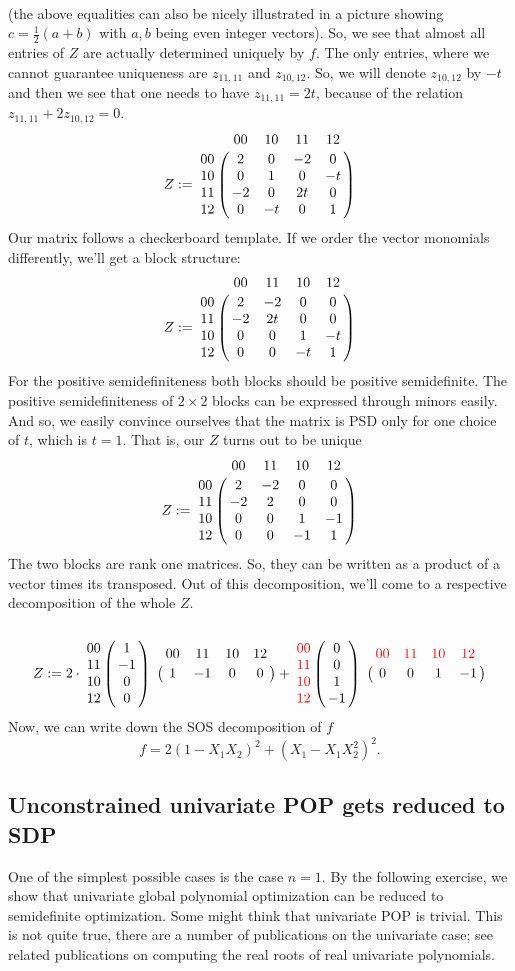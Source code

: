 \begin{solution}
\begin{align*}
		\end{align*}
		(the above equalities can also be nicely illustrated in a picture showing  $c= \frac{1}{2} (a+b)$ with $a,b$ being even integer vectors).
		So, we see that almost all entries of $Z$ are actually determined uniquely by $f$. The only entries, where we cannot guarantee uniqueness are $z_{11,11}$ and $z_{10,12}$. So, we will denote $z_{10,12}$ by $-t$ and then we see that one needs to have $z_{11,11}= 2t $, because of the relation $z_{11,11} + 2 z_{10,12} = 0$. 
		\[
		Z:=\bordermatrix{
			& 00 & 10 & 11 & 12
			\cr 00 & 2 & 0 & -2 & 0
			\cr 10 & 0 & 1 & 0 & -t
			\cr 11 & -2 & 0 & 2t & 0
			\cr 12 & 0 & -t & 0 & 1
		}
		\]
		Our matrix follows a checkerboard template. If we order the vector monomials differently, we'll get a block structure: 
		\[
		Z:=\bordermatrix{
			& 00 & 11 & 10 & 12
			\cr 00 & 2 & -2 & 0 & 0
			\cr 11 & -2 & 2t & 0 & 0
			\cr 10 & 0 & 0 & 1 & -t
			\cr 12 & 0 & 0 & -t & 1
		}
		\]		
		For the positive semidefiniteness both blocks should be positive semidefinite. The positive semidefiniteness of $2 \times 2$ blocks can be expressed through minors easily. And so, we easily convince ourselves that the matrix is PSD only for one choice of $t$, which is $t=1$. That is, our $Z$ turns out to be unique
		\[
		Z:=\bordermatrix{
			& 00 & 11 & 10 & 12
			\cr 00 & 2 & -2 & 0 & 0
			\cr 11 & -2 & 2 & 0 & 0
			\cr 10 & 0 & 0 & 1 & -1
			\cr 12 & 0 & 0 & -1 & 1
		}
		\]		
		The two blocks are rank one matrices. So, they can be written as a product of a vector times its transposed. Out of this decomposition, we'll come to a respective decomposition of the whole $Z$. 
		\[
		Z:=2 \cdot \bordermatrix{
			& 
			\cr 00 & 1 
			\cr 11 & -1 
			\cr 10 & 0 
			\cr 12 & 0 
		}
	\bordermatrix{
		& 00 & 11 & 10 & 12
		\cr  & 1 & -1 & 0 & 0
	}
	+ 
\bordermatrix{
	& 
	\cr \textcolor{red}{00} & 0
	\cr \textcolor{red}{11} & 0 
	\cr \textcolor{red}{10} & 1 
	\cr \textcolor{red}{12} & -1 
}
\bordermatrix{
	& \textcolor{red}{00} & \textcolor{red}{11} & \textcolor{red}{10} & \textcolor{red}{12}
	\cr  & 0 & 0 & 1 & -1
}		\]		
		Now, we can write down the SOS decomposition of $f$
		\[
			f = 2 (1- X_1X_2)^2 + (X_1 - X_1 X_2^2)^2.
		\]
\end{solution}


\subsection{Unconstrained univariate POP gets reduced to SDP}

One of the simplest possible cases is the case $n=1$. By the following exercise, we show that univariate global polynomial optimization can be reduced to semidefinite optimization. Some might think that univariate POP is trivial. This is not quite true, there are a number of publications on the univariate case; see related publications \cite{MR3385951,MR2736359,MR2742714} on computing the real roots of real univariate polynomials.




